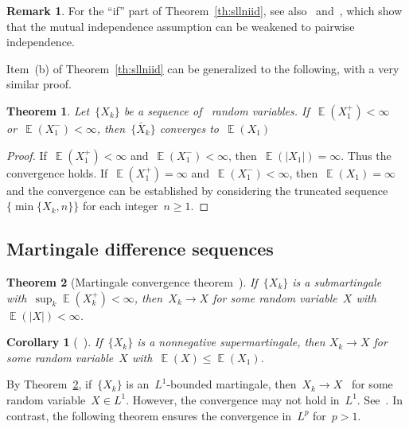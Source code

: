 \documentclass[12pt,a4paper]{article}  %
\newcounter{cite}
\newtheorem{theorem}{Theorem}[section]
\newtheorem{corollary}{Corollary}[section]
\theoremstyle{definition}
\newtheorem{remark}{Remark}[section]
\numberwithin{equation}{section}
\newcommand{\as}{{\text{a.s.}}\xspace}
\newcommand{\iid}{{\text{i.i.d.}}\xspace}
\DeclareMathOperator{\expc}{\mathbb{E}}
\begin{document}
\begin{remark}
    \label{rem:pair}
    For the ``if'' part of Theorem~\ref{th:sllniid}, see
    also~\cite[Theorem~1]{Etemadi_1981} and~\cite[Theorem~2.4.1]{Durrett_2019}, which show that
    the mutual independence assumption can be weakened to pairwise independence.
\end{remark}

Item~(b) of Theorem~\ref{th:sllniid} can be generalized to the following, with a very similar proof.

\begin{theorem}
    \label{th:sllniid2}
    Let~$\{X_k\}$ be a sequence of~\iid random variables. If~$\expc(X_1^+) < \infty$
    or~$\expc(X_1^-) < \infty$, then~$\{\bar{X}_k\}$ converges to~$\expc(X_1)$ \as
\end{theorem}

\begin{proof}
    If~$\expc(X_1^+)<\infty$ and~$\expc(X_1^-) < \infty$, then~$\expc(|X_1|) = \infty$. Thus the
    convergence holds. If~$\expc(X_1^+) = \infty$ and~$\expc(X_1^-) < \infty$,
    then~$\expc(X_1) = \infty$ and the convergence can be established by considering the truncated
    sequence $\{\min\{X_k, n\}\}$ for each integer~$n\ge 1$.
\end{proof}


\subsection{Martingale difference sequences}
\label{sec:md}

\begin{theorem}[Martingale convergence theorem~\mbox{\cite[Theorem 4.2.11]{Durrett_2019}}]
    \label{th:ml1}
    If~$\{X_k\}$ is a submartingale with~$\sup_k\expc(X_k^+)< \infty$, then~$X_k\to X$ \as for
    some random variable~$X$ with~$\expc(|X|)<\infty$.
\end{theorem}

\begin{corollary}[~\mbox{\cite[Theorem 4.2.12]{Durrett_2019}}]
    \label{coro:ml1}
    If~$\{X_k\}$ is a nonnegative supermartingale, then $X_k\to X$ \as for some random variable~$X$
    with~$\expc(X) \le \expc(X_1)$.
\end{corollary}

By Theorem~\ref{th:ml1}, if~$\{X_k\}$ is an~$L^1$-bounded martingale,
then~$X_k\to X$~\as for some random variable~$X\in L^1$. However, the convergence may not hold
in~$L^1$. See~\cite[Example 4.2.13]{Durrett_2019}. In contrast, the following theorem ensures
the convergence in~$L^p$ for~$p>1$.
\end{document}
